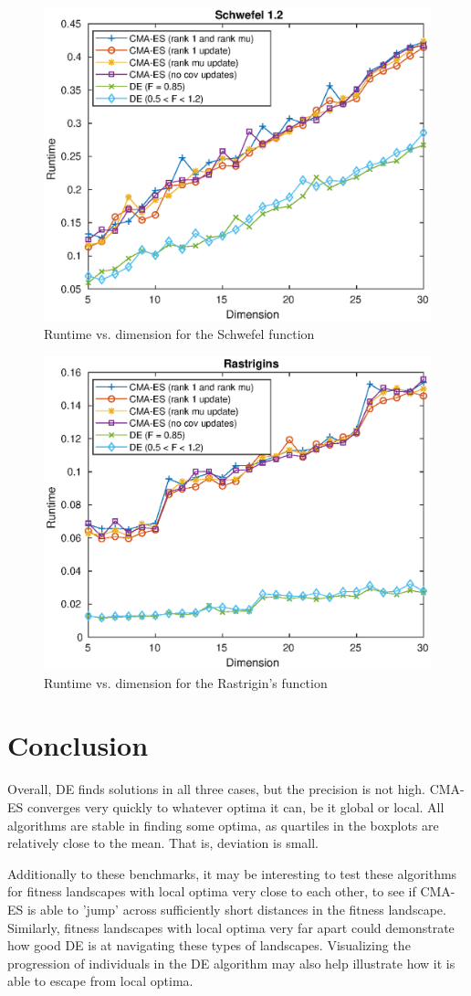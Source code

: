\documentclass[12pt]{article}
\begin{document}
\begin{figure}[H]
    \centering
    \includegraphics[width=0.75\linewidth]{pics/schwefel_TvN.eps}
    \caption{Runtime vs. dimension for the Schwefel function}
    \label{fig:schwefel_tvn}
\end{figure}

\begin{figure}[H]
    \centering
    \includegraphics[width=0.75\linewidth]{pics/rastrigins_TvN.eps}
    \caption{Runtime vs. dimension for the Rastrigin's function}
    \label{fig:rastrigins_tvn}
\end{figure}



\section{Conclusion}
Overall, DE finds solutions in all three cases, but the precision is not high. CMA-ES converges very quickly to whatever optima it can, be it global or local. All algorithms are stable in finding some optima, as quartiles in the boxplots are relatively close to the mean. That is, deviation is small. 

Additionally to these benchmarks, it may be interesting to test these algorithms for fitness landscapes with local optima very close to each other, to see if CMA-ES is able to 'jump' across sufficiently short distances in the fitness landscape. Similarly, fitness landscapes with local optima very far apart could demonstrate how good DE is at navigating these types of landscapes. Visualizing the progression of individuals in the DE algorithm may also help illustrate how it is able to escape from local optima.
\end{document}
